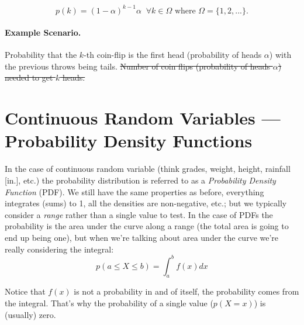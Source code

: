 \[p(k) = (1-\alpha)^{k-1}\alpha \;\; \forall k\in\Omega \text{ where } \Omega = \{1,2,...\}.\]


\paragraph{Example Scenario.} 
{\color{red}Probability that the $k$-th coin-flip is the first head (probability of heads $\alpha$) with the previous throws being tails.}
\sout{Number of coin flips (probability of heads $\alpha$) needed to get $k$ heads. }

\begin{center}
\end{center}

\section{Continuous Random Variables --- Probability Density Functions}
In the case of continuous random variable (think grades, weight, height, rainfall [in.], etc.) 
the probability distribution is referred to as a \emph{Probability Density Function} (PDF). 
We still have the same properties as before, everything integrates (sums) to 1, 
all the densities are non-negative, etc.; 
but we typically consider a \textit{range} rather than a single value to test. 
In the case of PDFs the probability is the area under the curve along a range (the total area is going to end up being one), 
but when we're talking about area under the curve we're really considering the integral:
\[p(a \le X \le b) = \int_{a}^{b} f(x)dx \]

Notice that $f(x)$ is not a probability in and of itself, the probability comes from the integral. 
That's why the probability of a single value ($p(X=x)$) is (usually) zero. 





